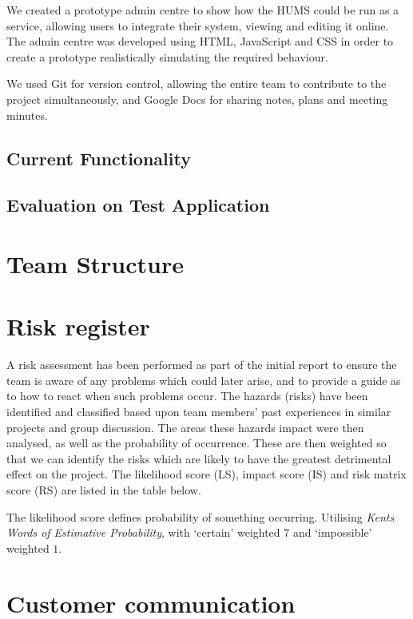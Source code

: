 \documentclass[10pt,a4paper]{article}
\begin{document}
We created a prototype admin centre to show how the HUMS could be run as a service, allowing users to integrate their system, viewing and editing it online. The admin centre was developed using HTML, JavaScript and CSS in order to create a prototype realistically simulating the required behaviour.

We used Git for version control, allowing the entire team to contribute to the project simultaneously, and Google Docs for sharing notes, plans and meeting minutes.
\subsection{Current Functionality}

\subsection{Evaluation on Test Application}

\section{Team Structure}

\section{Risk register}

A risk assessment has been performed as part of the initial report to ensure the
team is aware of any problems which could later arise, and to provide a guide as
to how to react when such problems occur. The hazards (risks) have been
identified and classified based upon team members' past experiences in similar
projects and group discussion. The areas these hazards impact were then
analysed, as well as the probability of occurrence. These are then weighted so
that we can identify the risks which are likely to have the greatest detrimental
effect on the project. The likelihood score (LS), impact score (IS) and risk matrix score 
(RS) are
listed in the table below.



The likelihood score defines probability of something occurring. Utilising
\textit{Kents Words of Estimative Probability}\cite{kent1966strategic}, with
`certain' weighted $7$ and `impossible' weighted $1$.




\section{Customer communication}

\vfill


\end{document}
